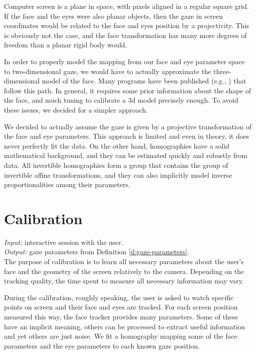 Computer screen is a plane in space, with pixels aligned in a regular square grid.
If the face and the eyes were also planar objects, then the gaze in screen coordinates would be related to the face and eyes position by a projectivity.
This is obviously not the case, and the face transformation has many more degrees of freedom than a planar rigid body would.
 
In order to properly model the mapping from our face and eye parameter space to two-dimensional gaze, we would have to actually approximate the three-dimensional model of the face.
Many programs have been published (e.g., \cite{fanelli11}) that follow this path.
In general, it requires some prior information about the shape of the face, and much tuning to calibrate a 3d model precisely enough.
To avoid these issues, we decided for a simpler approach.

We decided to actually assume the gaze is given by a projective transformation of the face and eye parameters.
This approach is limited and even in theory, it does never perfectly fit the data.
On the other hand, homographies have a solid mathematical background, and they can be estimated quickly and robustly from data.
All invertible homographies form a group that contains the group of invertible affine transformations, and they can also implicitly model inverse proportionalities among their parameters.



\section{Calibration}

\textit{Input:} interactive session with the user.\\
\textit{Output:} gaze parameters from Definition \ref{d:gaze-parameters}.\\

The purpose of calibration is to learn all necessary parameters about the user's face and the geometry of the screen relatively to the camera.
Depending on the tracking quality, the time spent to measure all necessary information may vary.

During the calibration, roughly speaking, the user is asked to watch specific points on screen and their face and eyes are tracked.
For each screen position measured this way, the face tracker provides many parameters.
Some of these have an implicit meaning, others can be processed to extract useful information and yet others are just noise.
We fit a homography mapping some of the face parameters and the eye parameters to each known gaze position.

